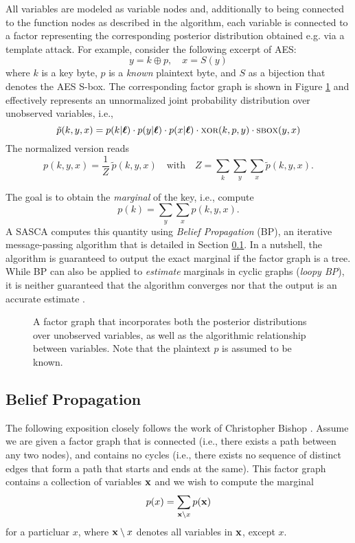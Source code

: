 All variables are modeled as variable nodes and, additionally to being connected to the function nodes as described in the algorithm, each variable is connected to a factor representing the corresponding posterior distribution obtained e.g. via a template attack.
For example, consider the following excerpt of AES: 
$$y = k \oplus p, \quad x = S(y)$$
where $k$ is a key byte, $p$ is a \textit{known} plaintext byte, and $S$ as a bijection that denotes the AES S-box.
The corresponding factor graph is shown in Figure \ref{fig:xor_sbox_fg} and effectively represents an unnormalized joint probability distribution over unobserved variables, i.e.,
$$ \tilde{p}(k,y,x) = p(k | \boldsymbol{\ell}) \cdot p(y | \boldsymbol{\ell}) \cdot p(x | \boldsymbol{\ell}) \cdot \textsc{xor}(k,p,y) \cdot \textsc{sbox}(y,x) $$
The normalized version reads
$$ p(k,y,x) = \frac{1}{Z} \ \tilde{p}(k,y,x) \quad \text{with} \quad Z = \sum_k \sum_y \sum_x \tilde{p}(k,y,x).$$ 

The goal is to obtain the \textit{marginal} of the key, i.e., compute
$$ p(k) = \sum_y \sum_x p(k,y,x).$$
A SASCA computes this quantity using \textit{Belief Propagation} (BP), an iterative message-passing algorithm that is detailed in Section \ref{sec:bp}. In a nutshell, the algorithm is guaranteed to output the exact marginal if the factor graph is a tree.
While BP can also be applied to \textit{estimate} marginals in cyclic graphs (\textit{loopy BP}), it is neither guaranteed that the algorithm converges nor that the output is an accurate estimate \cite{bp}.

\begin{figure}[ht]
    \begin{center}
    \scalebox{1.25}{
        
    }
    \end{center}
    \caption{A factor graph that incorporates both the posterior distributions over unobserved variables, as well as the algorithmic relationship between variables. Note that the plaintext $p$ is assumed to be known.}
    \label{fig:xor_sbox_fg}
\end{figure}

\subsection{Belief Propagation}
\label{sec:bp}

The following exposition closely follows the work of Christopher Bishop \cite{bishop}.
Assume we are given a factor graph that is connected (i.e., there exists a path between any two nodes), and contains no cycles (i.e., there exists no sequence of distinct edges that form a path that starts and ends at the same). This factor graph contains a collection of variables $\mathbf{x}$ and we wish to compute the marginal 
\begin{equation}
    p(x) = \sum_{\mathbf{x} \setminus x} p(\mathbf{x})
\end{equation}
for a particluar $x$, where $\mathbf{x} \setminus x$ denotes all variables in $\mathbf{x}$, except $x$.

